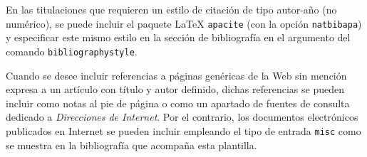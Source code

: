 En las titulaciones que requieren un estilo de citación de tipo autor-año (no numérico), se puede incluir el paquete \LaTeX{} \texttt{apacite} (con la opción \texttt{natbibapa}) y especificar este mismo estilo en la sección de bibliografía en el argumento del comando \texttt{bibliographystyle}.

Cuando se desee incluir referencias a páginas genéricas de la Web sin mención expresa a un artículo con título y autor definido, dichas referencias se pueden incluir como notas al pie de página o como un apartado de fuentes de consulta dedicado a \emph{Direcciones de Internet}. Por el contrario, los documentos electrónicos publicados en Internet se pueden incluir empleando el tipo de entrada \texttt{misc} como se muestra en la bibliografía que acompaña esta plantilla.




